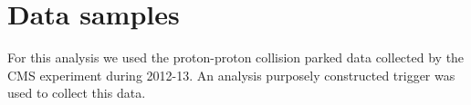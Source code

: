 \section{Data samples}

For this analysis we used the proton-proton collision parked data collected by the CMS experiment during 2012-13. An analysis purposely constructed trigger was used to collect this data.





